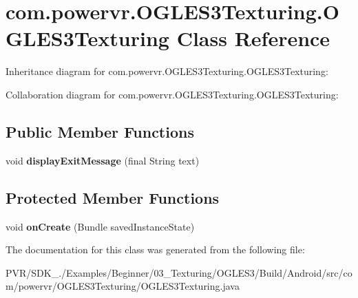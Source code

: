 \hypertarget{classcom_1_1powervr_1_1_o_g_l_e_s3_texturing_1_1_o_g_l_e_s3_texturing}{\section{com.\+powervr.\+O\+G\+L\+E\+S3\+Texturing.\+O\+G\+L\+E\+S3\+Texturing Class Reference}
\label{classcom_1_1powervr_1_1_o_g_l_e_s3_texturing_1_1_o_g_l_e_s3_texturing}
}


Inheritance diagram for com.\+powervr.\+O\+G\+L\+E\+S3\+Texturing.\+O\+G\+L\+E\+S3\+Texturing\+:


Collaboration diagram for com.\+powervr.\+O\+G\+L\+E\+S3\+Texturing.\+O\+G\+L\+E\+S3\+Texturing\+:
\subsection*{Public Member Functions}
\begin{DoxyCompactItemize}
\item 
\hypertarget{classcom_1_1powervr_1_1_o_g_l_e_s3_texturing_1_1_o_g_l_e_s3_texturing_a72f4800b210e499402d391d7b4a2c2b3}{void {\bfseries display\+Exit\+Message} (final String text)}\label{classcom_1_1powervr_1_1_o_g_l_e_s3_texturing_1_1_o_g_l_e_s3_texturing_a72f4800b210e499402d391d7b4a2c2b3}

\end{DoxyCompactItemize}
\subsection*{Protected Member Functions}
\begin{DoxyCompactItemize}
\item 
\hypertarget{classcom_1_1powervr_1_1_o_g_l_e_s3_texturing_1_1_o_g_l_e_s3_texturing_a948a139b13164128f1793a1a8020b6c3}{void {\bfseries on\+Create} (Bundle saved\+Instance\+State)}\label{classcom_1_1powervr_1_1_o_g_l_e_s3_texturing_1_1_o_g_l_e_s3_texturing_a948a139b13164128f1793a1a8020b6c3}

\end{DoxyCompactItemize}


The documentation for this class was generated from the following file\+:\begin{DoxyCompactItemize}
\item 
P\+V\+R/\+S\+D\+K\+\_./\+Examples/\+Beginner/03\+\_\+\+Texturing/\+O\+G\+L\+E\+S3/\+Build/\+Android/src/com/powervr/\+O\+G\+L\+E\+S3\+Texturing/O\+G\+L\+E\+S3\+Texturing.\+java\end{DoxyCompactItemize}
